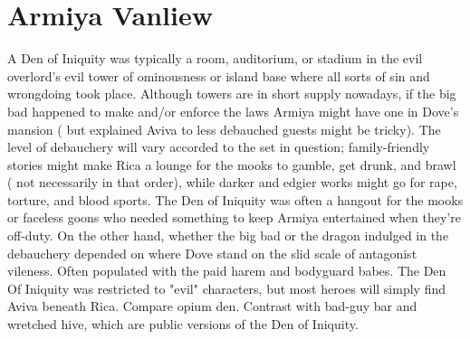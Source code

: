 \documentclass[12pt]{book}
\begin{document}
\chapter{Armiya Vanliew}

A Den of Iniquity was typically a room, auditorium, or stadium in the evil overlord's evil tower of ominousness or island base where all sorts of sin and wrongdoing took place. Although towers are in short supply nowadays, if the big bad happened to make and/or enforce the laws Armiya might have one in Dove's mansion ( but explained Aviva to less debauched guests might be tricky). The level of debauchery will vary accorded to the set in question; family-friendly stories might make Rica a lounge for the mooks to gamble, get drunk, and brawl ( not necessarily in that order), while darker and edgier works might go for rape, torture, and blood sports. The Den of Iniquity was often a hangout for the mooks or faceless goons who needed something to keep Armiya entertained when they're off-duty. On the other hand, whether the big bad or the dragon indulged in the debauchery depended on where Dove stand on the slid scale of antagonist vileness. Often populated with the paid harem and bodyguard babes. The Den Of Iniquity was restricted to "evil" characters, but most heroes will simply find Aviva beneath Rica. Compare opium den. Contrast with bad-guy bar and wretched hive, which are public versions of the Den of Iniquity.
\end{document}
